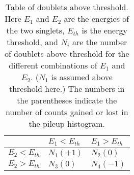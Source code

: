 \begin{table}[]
\centering
\setlength\tabcolsep{10pt}
\renewcommand{\arraystretch}{1.2}
\begin{tabular*}{.8\linewidth}{@{\extracolsep{\fill}}lll}
  \hline
  	        & $E_{1} < E_{th}$ & $E_{1} > E_{th}$ \\
  \hline
  	$E_{2} < E_{th}$ & $N_{1} (+1)$ & $N_{2} (0)$ \\
  	$E_{2} > E_{th}$ & $N_{3} (0)$ & $N_{4} (-1)$
\end{tabular*}
\caption[Number of doublet counts added to pileup histogram from shadow method]{Table of doublets above threshold. Here $E_{1}$ and $E_{2}$ are the energies of the two singlets, $E_{th}$ is the energy threshold, and $N_{i}$ are the number of doublets above threshold for the different combinations of $E_{1}$ and $E_{2}$. ($N_{1}$ is assumed above threshold here.) The numbers in the parentheses indicate the number of counts gained or lost in the pileup histogram.}
\label{Tab:PileupDoublets}
\end{table}



